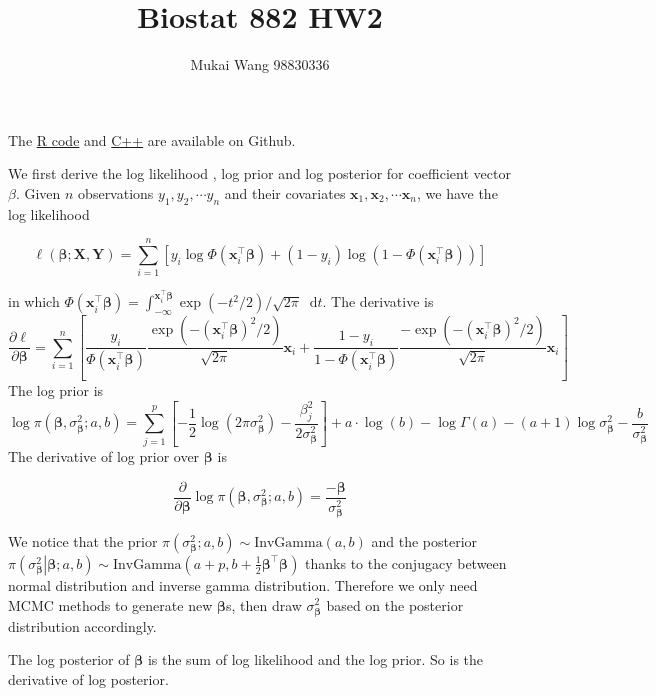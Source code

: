\documentclass[12pt]{article}
\title{Biostat 882 HW2}
\date{}
\author{Mukai Wang 98830336}
\newcommand*\diff{\mathop{}\!\mathrm{d}}
\begin{document}
\maketitle

The \href{https://github.com/mkbwang/BIOSTAT882/blob/master/HW2/HW2code.R}{R code} and \href{https://github.com/mkbwang/BIOSTAT882/blob/master/HW2/BayesProbitReg.cpp}{C++} are available on Github.

We first derive the log likelihood , log prior and log posterior for coefficient vector $\beta$. Given $n$ observations $y_1, y_2, \cdots y_n$ and their covariates $\bm{x}_1, \bm{x}_2, \cdots \bm{x}_n$, we have the log likelihood

\[ \ell(\bm{\beta}; \bm{X}, \bm{Y}) = \sum_{i=1}^{n} \left[ y_i \log \Phi(\bm{x}_i^\top \bm{\beta}) + (1-y_i) \log \left(1 - \Phi(\bm{x}_i^\top \bm{\beta})\right)\right] \]

 in which $\Phi(\bm{x}_i^\top \bm{\beta}) = \int_{-\infty}^{\bm{x}_i^\top \bm{\beta}} \exp \left(-t^2 / 2 \right) / \sqrt{2\pi} \diff t$. The derivative is 
 \[\frac{\partial \ell}{\partial \bm{\beta}} = \sum_{i=1}^{n} \left[ \frac{y_i}{\Phi(\bm{x}_i^\top \bm{\beta})} \frac{\exp (-(\bm{x}_i^\top \bm{\beta})^2 / 2)}{\sqrt{2\pi}}\bm{x}_i + \frac{1-y_i}{1-\Phi(\bm{x}_i^\top \bm{\beta})} \frac{-\exp (-(\bm{x}_i^\top \bm{\beta})^2 / 2)}{\sqrt{2\pi}} \bm{x}_i \right] \]
The log prior is
\[ \log \pi(\bm{\beta}, \sigma^2_{\bm{\beta}}; a,b) = \sum_{j=1}^{p}\left[-\frac{1}{2}\log(2\pi\sigma^2_{\bm{\beta}}) - \frac{\beta^2_j}{2\sigma^2_{\bm{\beta}} } \right] + a\cdot \log(b) - \log\Gamma(a) - (a+1)\log \sigma^2_{\bm{\beta}} - \frac{b}{\sigma^2_{\bm{\beta}}} \]
The derivative of log prior over $\bm{\beta}$ is

\[ \frac{\partial}{\partial \bm{\beta}}\log \pi(\bm{\beta}, \sigma^2_{\bm{\beta}}; a,b) = \frac{-\bm{\beta}}{\sigma^2_{\bm{\beta}}} \]

We notice that the prior  $\pi\left(\sigma^2_{\bm{\beta}}; a,b\right) \sim \text{InvGamma}(a, b)$ and the posterior $\pi\left(\left. \sigma^2_{\bm{\beta}}\right\vert \bm{\beta}; a,b\right) \sim \text{InvGamma}\left(a+p, b+\frac{1}{2}\bm{\beta}^\top \bm{\beta}\right)$ thanks to the conjugacy between normal distribution and inverse gamma distribution. Therefore we only need MCMC methods to generate new $\bm{\beta}$s, then draw $\sigma^2_{\bm{\beta}}$ based on the posterior distribution accordingly.

The log posterior of $\bm{\beta}$ is the sum of log likelihood and the log prior. So is the derivative of log posterior.
\end{document}
